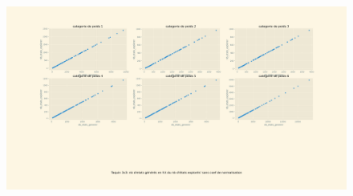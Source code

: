 \documentclass[a4paper, 12pt]{article}
\begin{document}
\begin{figure}[H]
    \centering
    \includegraphics[width=\textwidth]{Taquin 3x3 nombre d'etats generer en fct du nb d etat explorer sans coef}
\end{figure}
\end{document}
